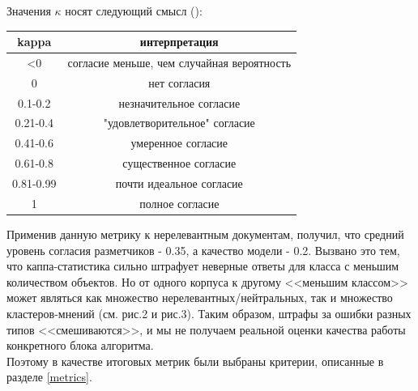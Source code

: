 \documentclass{article}
\begin{document}
Значения $\kappa$ носят следующий смысл (\cite{litlink11}):
\begin{table}[!htb]
\center
\begin{tabular}{|c|c|}
\hline
kappa        & интерпретация                              \\ \hline
\textless{}0 & согласие меньше, чем случайная вероятность \\ \hline
0            & нет согласия                               \\ \hline
0.1-0.2      & незначительное согласие                    \\ \hline
0.21-0.4     & "удовлетворительное" согласие              \\ \hline
0.41-0.6     & умеренное согласие                         \\ \hline
0.61-0.8     & существенное согласие                      \\ \hline
0.81-0.99    & почти идеальное согласие                   \\ \hline
1            & полное согласие                            \\ \hline
\end{tabular}
\end{table}
\newline
Применив данную метрику к нерелевантным документам, получил, что средний уровень согласия разметчиков - 0.35, а качество модели - 0.2. Вызвано это тем, что каппа-статистика сильно штрафует неверные ответы для класса с меньшим количеством объектов. Но от одного корпуса к другому <<меньшим классом>> может являться как множество нерелевантных/нейтральных, так и множество кластеров-мнений (см. рис.2 и рис.3). Таким образом, штрафы за ошибки разных типов <<смешиваются>>, и мы не получаем реальной оценки качества работы конкретного блока алгоритма. \\

Поэтому в качестве итоговых метрик были выбраны критерии, описанные в разделе \textcolor{cyan}{\ref{metrics}}.
\end{document}
